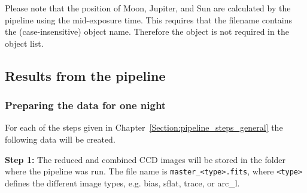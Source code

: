 \documentclass[10pt,a4paper]{article}
\begin{document}
Please note that the position of Moon, Jupiter, and Sun are calculated by the pipeline using the mid-exposure time. This requires that the filename contains the (case-insensitive) object name. Therefore the object is not required in the object list.


\subsection{Results from the pipeline}

\subsubsection{Preparing the data for one night}
\label{section:results_pipeline}
For each of the steps given in Chapter~\ref{Section:pipeline_steps_general} the following data will be created.

\noindent \textbf{Step 1:} The reduced and combined CCD images will be stored in the folder where the pipeline was run. The file name is \verb|master_<type>.fits|, where \verb|<type>| defines the different image types, e.g. bias, sflat, trace, or arc\_l.
\end{document}
